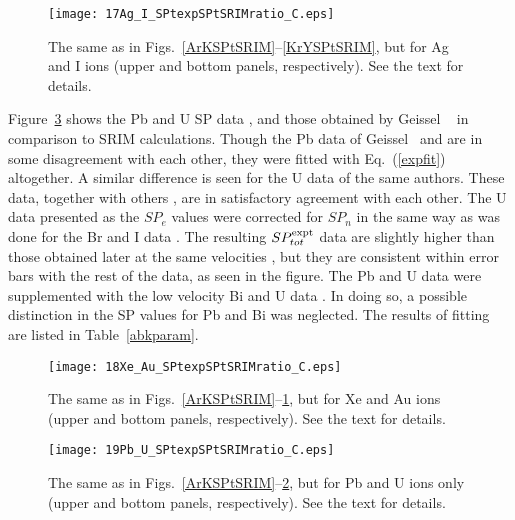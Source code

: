 \documentclass[aps,pra,twocolumn,amsmath,amssymb,floatfix]{revtex4-2}
\begin{document}
\begin{figure}[!h]   %
\begin{center}
\texttt{[image: 17Ag\_I\_SPtexpSPtSRIMratio\_C.eps]}
\caption{\label{AgISPtSRIM} The same as in Figs.~\ref{ArKSPtSRIM}--\ref{KrYSPtSRIM}, but for Ag and I ions (upper and bottom panels, respectively). See the text for details.}
\end{center}
\end{figure}

Figure~\ref{PbUSPtSRIM} shows the Pb and U SP data \cite{Lennard86,BrownMoak72,Pape78,Echler12}, and those obtained by Geissel \ea\ \cite{IAEASP} in comparison to SRIM calculations. Though the Pb data of Geissel \ea\ and \cite{Pape78} are in some disagreement with each other, they were fitted with Eq.~(\ref{expfit}) altogether. A similar difference is seen for the U data of the same authors. These data, together with others \cite{BrownMoak72,Echler12}, are in satisfactory agreement with each other. The U data \cite{BrownMoak72} presented as the $SP_{e}$ values were corrected for $SP_{n}$ in the same way as was done for the Br and I data \cite{BrownMoak72}. The resulting $SP_{tot}^{\rm expt}$ data are slightly higher than those obtained later at the same velocities \cite{Echler12}, but they are consistent within error bars with the rest of the data, as seen in the figure. The Pb and U data were supplemented with the low velocity Bi and U data \cite{Lennard86}. In doing so, a possible distinction in the SP values for Pb and Bi was  neglected. The results of fitting are listed in Table~\ref{abkparam}.

\begin{figure}[!h]   %
\begin{center}
\texttt{[image: 18Xe\_Au\_SPtexpSPtSRIMratio\_C.eps]}
\caption{\label{XeAuSPtSRIM} The same as in Figs.~\ref{ArKSPtSRIM}--\ref{AgISPtSRIM}, but for Xe and Au ions (upper and bottom panels, respectively). See the text for details.}
\end{center}
\end{figure}

\begin{figure}[!h]  %
\begin{center}
\texttt{[image: 19Pb\_U\_SPtexpSPtSRIMratio\_C.eps]}
\caption{\label{PbUSPtSRIM}The same as in Figs.~\ref{ArKSPtSRIM}--\ref{XeAuSPtSRIM}, but for Pb and U ions only (upper and bottom panels, respectively). See the text for details.}
\end{center}
\end{figure}
\end{document}
